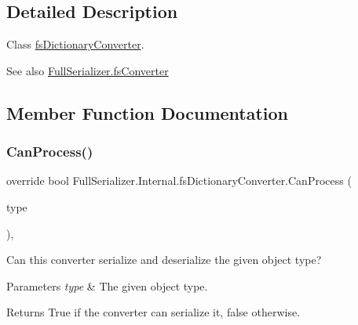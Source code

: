 \subsection{Detailed Description}
Class \hyperlink{class_full_serializer_1_1_internal_1_1fs_dictionary_converter}{fs\+Dictionary\+Converter}. 

\begin{DoxySeeAlso}{See also}
\hyperlink{class_full_serializer_1_1fs_converter}{Full\+Serializer.\+fs\+Converter}


\end{DoxySeeAlso}


\subsection{Member Function Documentation}
\mbox{\label{class_full_serializer_1_1_internal_1_1fs_dictionary_converter_a00582c5fe666a61ae4d528848bdffbd7}} 
\subsubsection{\texorpdfstring{Can\+Process()}{CanProcess()}}
{\footnotesize\ttfamily override bool Full\+Serializer.\+Internal.\+fs\+Dictionary\+Converter.\+Can\+Process (\begin{DoxyParamCaption}\item[{Type}]{type }\end{DoxyParamCaption})\hspace{0.3cm}{\ttfamily [inline]}, {\ttfamily [virtual]}}



Can this converter serialize and deserialize the given object type? 


\begin{DoxyParams}{Parameters}
{\em type} & The given object type.\\
\hline
\end{DoxyParams}
\begin{DoxyReturn}{Returns}
True if the converter can serialize it, false otherwise.
\end{DoxyReturn}


